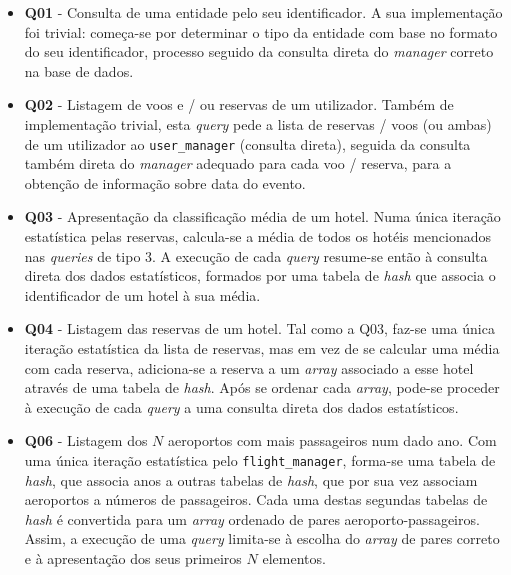 \documentclass[12pt, a4paper]{article}
\begin{document}
\begin{itemize}
    \item \textbf{Q01} - Consulta de uma entidade pelo seu identificador. A sua implementação foi
                         trivial: começa-se por determinar o tipo da entidade com base no formato
                         do seu identificador, processo seguido da consulta direta do \emph{manager}
                         correto na base de dados.

    \item \textbf{Q02} - Listagem de voos e / ou reservas de um utilizador. Também de implementação
                         trivial, esta \emph{query} pede a lista de reservas / voos (ou ambas) de um
                         utilizador ao \texttt{user\_manager} (consulta direta), seguida da consulta
                         também direta do \emph{manager} adequado para cada voo / reserva, para a
                         obtenção de informação sobre data do evento.

    \item \textbf{Q03} - Apresentação da classificação média de um hotel. Numa única iteração
                         estatística pelas reservas, calcula-se a média de todos os hotéis
                         mencionados nas \emph{queries} de tipo 3. A execução de cada \emph{query}
                         resume-se então à consulta direta dos dados estatísticos, formados por uma
                         tabela de \emph{hash} que associa o identificador de um hotel à sua média.

    \item \textbf{Q04} - Listagem das reservas de um hotel. Tal como a Q03, faz-se uma única
                         iteração estatística da lista de reservas, mas em vez de se calcular uma
                         média com cada reserva, adiciona-se a reserva a um \emph{array} associado
                         a esse hotel através de uma tabela de \emph{hash}. Após se ordenar cada
                         \emph{array}, pode-se proceder à execução de cada \emph{query} a uma
                         consulta direta dos dados estatísticos.

    \item \textbf{Q06} - Listagem dos $N$ aeroportos com mais passageiros num dado ano. Com uma
                         única iteração estatística pelo \texttt{flight\_manager}, forma-se uma
                         tabela de \emph{hash}, que associa anos a outras tabelas de \emph{hash},
                         que por sua vez associam aeroportos a números de passageiros. Cada uma
                         destas segundas tabelas de \emph{hash} é convertida para um \emph{array}
                         ordenado de pares aeroporto-passageiros. Assim, a execução de uma
                         \emph{query} limita-se à escolha do \emph{array} de pares correto e à
                         apresentação dos seus primeiros $N$ elementos.


\end{itemize}
\end{document}
